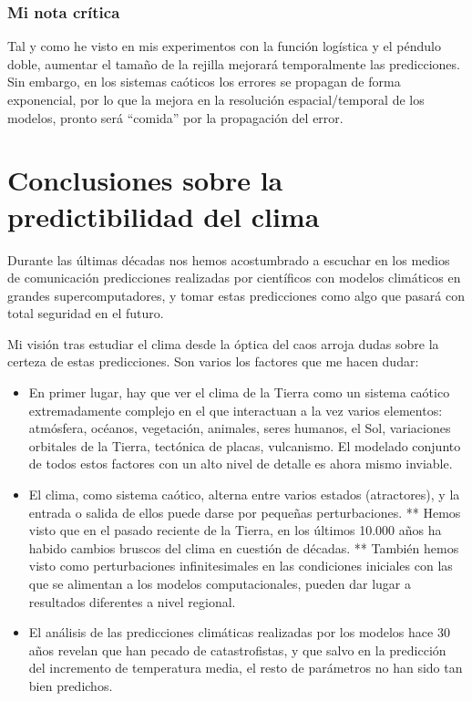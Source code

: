 \documentclass[
  10pt,
  a4paper,
  DIV=11,
  numbers=noendperiod,
  open=any]{scrreprt}
\providecommand{\tightlist}{%
  \setlength{\itemsep}{0pt}\setlength{\parskip}{0pt}}
\numberwithin{equation}{chapter}
\numberwithin{equation}{chapter}
\renewcommand{\[}{\begin{equation}}
\renewcommand{\]}{\end{equation}}
\begin{document}
\subsection{Mi nota crítica}\label{mi-nota-cruxedtica}

Tal y como he visto en mis experimentos con la función logística y el
péndulo doble, aumentar el tamaño de la rejilla mejorará temporalmente
las predicciones. Sin embargo, en los sistemas caóticos los errores se
propagan de forma exponencial, por lo que la mejora en la resolución
espacial/temporal de los modelos, pronto será ``comida'' por la
propagación del error.


\chapter{Conclusiones sobre la predictibilidad del
clima}\label{conclusiones-sobre-la-predictibilidad-del-clima}

Durante las últimas décadas nos hemos acostumbrado a escuchar en los
medios de comunicación predicciones realizadas por científicos con
modelos climáticos en grandes supercomputadores, y tomar estas
predicciones como algo que pasará con total seguridad en el futuro.

Mi visión tras estudiar el clima desde la óptica del caos arroja dudas
sobre la certeza de estas predicciones. Son varios los factores que me
hacen dudar:

\begin{itemize}
\tightlist
\item
  En primer lugar, hay que ver el clima de la Tierra como un sistema
  caótico extremadamente complejo en el que interactuan a la vez varios
  elementos: atmósfera, océanos, vegetación, animales, seres humanos, el
  Sol, variaciones orbitales de la Tierra, tectónica de placas,
  vulcanismo. El modelado conjunto de todos estos factores con un alto
  nivel de detalle es ahora mismo inviable.
\item
  El clima, como sistema caótico, alterna entre varios estados
  (atractores), y la entrada o salida de ellos puede darse por pequeñas
  perturbaciones. ** Hemos visto que en el pasado reciente de la Tierra,
  en los últimos 10.000 años ha habido cambios bruscos del clima en
  cuestión de décadas. ** También hemos visto como perturbaciones
  infinitesimales en las condiciones iniciales con las que se alimentan
  a los modelos computacionales, pueden dar lugar a resultados
  diferentes a nivel regional.
\item
  El análisis de las predicciones climáticas realizadas por los modelos
  hace 30 años revelan que han pecado de catastrofistas, y que salvo en
  la predicción del incremento de temperatura media, el resto de
  parámetros no han sido tan bien predichos.
\end{itemize}
\end{document}

